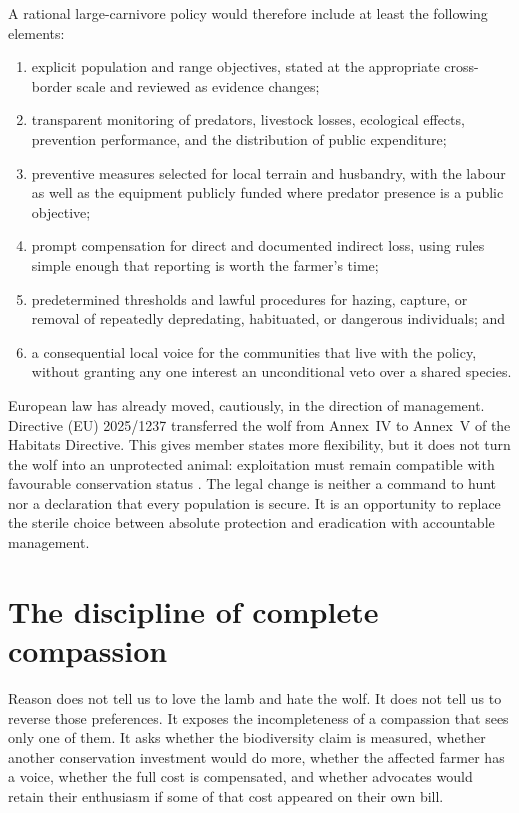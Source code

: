 ﻿\documentclass[12pt,a4paper]{book}
\begin{document}
A rational large-carnivore policy would therefore include at least the
following elements:

\begin{enumerate}
\item explicit population and range objectives, stated at the appropriate
cross-border scale and reviewed as evidence changes;

\item transparent monitoring of predators, livestock losses, ecological
effects, prevention performance, and the distribution of public expenditure;

\item preventive measures selected for local terrain and husbandry, with the
labour as well as the equipment publicly funded where predator presence is a
public objective;

\item prompt compensation for direct and documented indirect loss, using
rules simple enough that reporting is worth the farmer's time;

\item predetermined thresholds and lawful procedures for hazing, capture, or
removal of repeatedly depredating, habituated, or dangerous individuals; and

\item a consequential local voice for the communities that live with the
policy, without granting any one interest an unconditional veto over a shared
species.
\end{enumerate}

European law has already moved, cautiously, in the direction of management.
Directive (EU) 2025/1237 transferred the wolf from Annex~IV to Annex~V of the
Habitats Directive.  This gives member states more flexibility, but it does
not turn the wolf into an unprotected animal: exploitation must remain
compatible with favourable conservation status
\cite{EUWolfProtectionDirective2025}.  The legal change is neither a command
to hunt nor a declaration that every population is secure.  It is an
opportunity to replace the sterile choice between absolute protection and
eradication with accountable management.

\section{The discipline of complete compassion}

Reason does not tell us to love the lamb and hate the wolf.  It does not tell
us to reverse those preferences.  It exposes the incompleteness of a
compassion that sees only one of them.  It asks whether the biodiversity claim
is measured, whether another conservation investment would do more, whether
the affected farmer has a voice, whether the full cost is compensated, and
whether advocates would retain their enthusiasm if some of that cost appeared
on their own bill.
\end{document}
